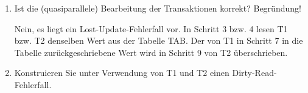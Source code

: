 \documentclass{lehramt-informatik-aufgabe}
\begin{document}
\begin{enumerate}

%

\item Ist die (quasiparallele) Bearbeitung der Transaktionen korrekt?
Begründung!

\begin{antwort}
Nein, es liegt ein Lost-Update-Fehlerfall vor. In Schritt 3 bzw. 4
lesen T1 bzw. T2 denselben Wert aus der Tabelle TAB. Der von T1 in
Schritt 7 in die Tabelle zurückgeschriebene Wert wird in Schritt 9 von
T2 überschrieben.
\end{antwort}

%

\item Konstruieren Sie unter Verwendung von T1 und T2 einen
Dirty-Read-Fehlerfall.
\end{enumerate}
\end{document}
